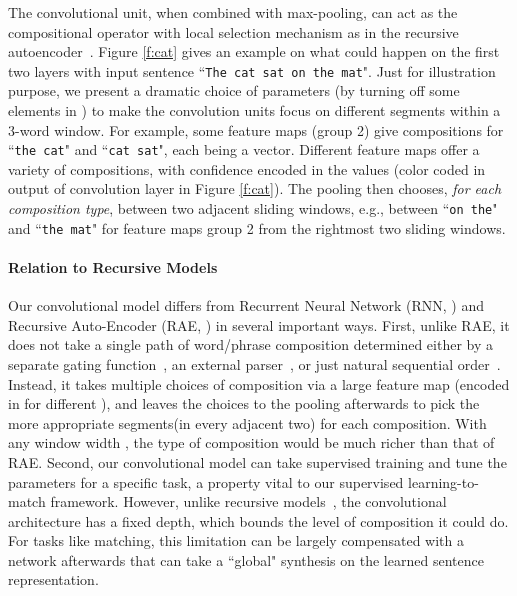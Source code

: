 \documentclass{article} \usepackage{nips14submit_e,times}
\newcommand{\0}{\ensuremath{\mathbf{0}}}
\newcommand{\1}{\ensuremath{\mathbf{1}}}
\begin{document}
The convolutional unit, when combined with max-pooling, can act as the compositional operator with local selection mechanism as in the recursive autoencoder~\cite{RAE}. Figure \ref{f:cat} gives an example on what could happen on the first two layers with input sentence ``\texttt{\small The cat sat on the mat}". Just for illustration purpose, we present a dramatic choice of parameters (by turning off some elements in ) to make the convolution units focus on different segments within a 3-word window. For example, some feature maps (group 2) give compositions for ``\texttt{\small the cat}" and ``\texttt{\small cat sat}", each being a vector. Different feature maps offer a variety of compositions, with confidence encoded in the values (color coded in output of convolution layer in Figure \ref{f:cat}). The pooling then chooses, \emph{for each composition type}, between two adjacent sliding windows, e.g., between ``\texttt{\small on the}" and ``\texttt{\small the mat}" for feature maps group 2 from the rightmost two sliding windows.

\paragraph{Relation to Recursive Models} Our convolutional model differs from Recurrent Neural Network (RNN, \cite{RNN}) and Recursive Auto-Encoder (RAE, \cite{RAE}) in several important ways. First, unlike RAE, it does not take a single path of word/phrase composition determined either by a separate gating function~\cite{RAE}, an external parser~\cite{socher2011}, or just natural sequential order~\cite{socherRNN}. Instead, it takes multiple choices of composition via a large feature map (encoded in  for different ), and leaves the choices to the pooling afterwards to pick the more appropriate segments(in every adjacent two) for each composition. With any window width , the type of composition would be much richer than that of RAE. Second, our convolutional model can take supervised training and tune the parameters for a specific task, a property vital to our supervised learning-to-match framework. However, unlike recursive models~\cite{socherRNN, RAE}, the convolutional architecture has a fixed depth, which bounds the level of composition it could do. For tasks like matching, this limitation can be largely compensated with a network afterwards that can take a ``global" synthesis on the learned sentence representation.
\end{document}
